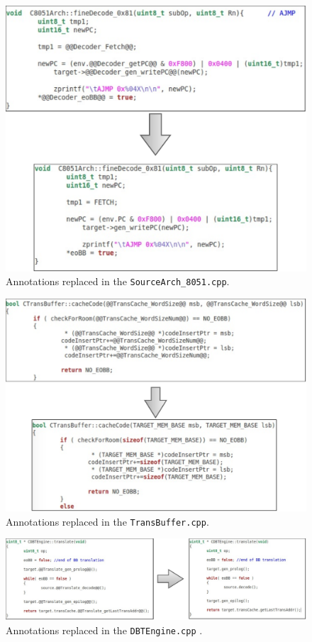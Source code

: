 \begin{figure}[H]
\centerline{
\includegraphics[scale=0.4]{images/annotation_test1}
}
\caption{Annotations replaced in the \texttt{SourceArch\_8051.cpp}.}
\label{fig:annotation_test1}
\end{figure}

\begin{figure}[H]
\centerline{
\includegraphics[scale=0.5]{images/annotation_test2}
}
\caption{Annotations replaced in the \texttt{TransBuffer.cpp}.}
\label{fig:annotation_test2}
\end{figure}

\begin{figure}[H]
\centerline{
\includegraphics[scale=0.5]{images/annotation_test3}
}
\caption{Annotations replaced in the \texttt{DBTEngine.cpp} .}
\label{fig:annotation_test3}
\end{figure}


